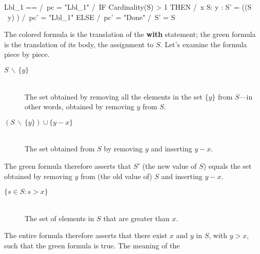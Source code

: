 \begin{display}
\begin{notla}
Lbl_1 == /\ pc = "Lbl_1"
         /\ IF Cardinality(S) > 1
               THEN /\ \E x \in S:
                         \E y :
                           S' = ((S \ {y}) )
                    /\ pc' = "Lbl_1"
               ELSE /\ pc' = "Done"
                    /\ S' = S
\end{notla}
\begin{tlatex} %
{}%
%
%
%
%
%
\end{tlatex}
\end{display}
The colored formula is the translation of the \textbf{with} statement;
the green formula is the translation of its body, the assignment to $S$.
Let's examine the formula piece by piece.
\begin{description}
\item[\darkgreen$S \,\backslash\, \{y\}$] \mbox{}\\
The set obtained by removing all the
elements in the set $\{y\}$ from $S$---in other words, obtained by
removing $y$ from $S$.

\item[\darkgreen$(S \,\backslash\, \{y\})\cup \{y - x\}$] \mbox{}\\
The set obtained from $S$ by removing $y$ and inserting $y-x$.
\end{description}
The green formula therefore asserts that $S'$ (the new value of $S$)
equals the set obtained by removing $y$ from (the old value of) $S$
and inserting $y-x$.
\begin{description}
\item[\red$\{s \in S : s > x\}$] \mbox{}\\ 
The set of elements in $S$
that are greater than $x$.
\end{description}
The entire formula therefore asserts that there exist $x$ and $y$ in
$S$, with $y>x$, such that the green formula is true.  
The meaning
of the 
